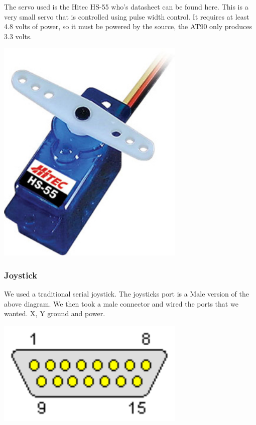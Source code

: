 The servo used is the Hitec HS-55 who's datasheet can be found here. This is a very small servo that is controlled using pulse width control. It requires at least 4.8 volts of power, so it must be powered by the source, the AT90 only produces 3.3 volts.


  \begin{center}
    \includegraphics[width=90mm]{imageSources/servo.png}
  \end{center}
  \label{servo}


\subsubsection{Joystick}
We used a traditional serial joystick. The joysticks port is a Male version of the above diagram. We then took a male connector and wired the ports that we wanted. X, Y ground and power. 


  \begin{center}
    \includegraphics[width=90mm]{imageSources/joystick.png}
  \end{center}
  \label{joystick}


